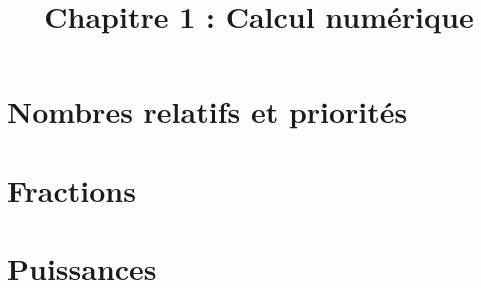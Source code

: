 \title{\vspace{-2em}Chapitre 1 : Calcul numérique\vspace{-3em}}%
\date{ }
\maketitle



\section{Nombres relatifs et priorités}



\section{Fractions}



\section{Puissances}

